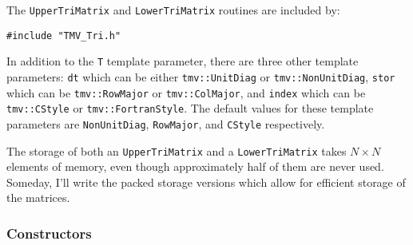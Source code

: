 \documentclass[twoside,letterpaper,11pt]{article}
\renewcommand{\tt}[1]{{\texttt {#1}}}
\begin{document}
The \tt{UpperTriMatrix} and \tt{LowerTriMatrix} routines are included by:
\begin{verbatim}
#include "TMV_Tri.h"
\end{verbatim}

In addition to the \tt{T} template parameter, there are three other template 
parameters:
\tt{dt} which can be either \tt{tmv::UnitDiag} or \tt{tmv::NonUnitDiag},
\tt{stor} which can be \tt{tmv::RowMajor} or \tt{tmv::ColMajor},
and \tt{index} which can be \tt{tmv::CStyle} or \tt{tmv::FortranStyle}.
The default values for these template parameters are 
\tt{NonUnitDiag}, \tt{RowMajor}, and \tt{CStyle} respectively.

The storage of both an \tt{UpperTriMatrix} and a \tt{LowerTriMatrix} takes
$N \times N$ elements of memory, even though approximately half of them 
are never used.  Someday, I'll write the packed storage versions which allow for
efficient storage of the matrices.

\subsubsection{Constructors}
\end{document}
